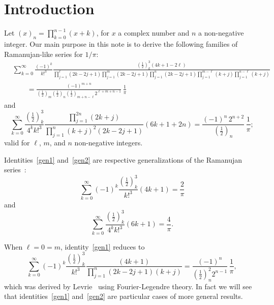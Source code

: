 \documentclass[12pt,reqno]{article}
\begin{document}
\section{Introduction}
Let $\left( x \right)_n  = \prod_{k = 0}^{n - 1} {\left( {x + k} \right)} $, for $x$ a complex number and $n$ a non-negative integer. Our main purpose in this note is to derive the following families of Ramanujan-like series for $1/\pi$:
\begin{align}\label{gen1}
&\sum_{k = 0}^\infty  {\frac{{( - 1)^k }}{{k!^3 }}\frac{{\left( {\frac{1}{2}} \right)_k^3 \left( {4k + 1 - 2\ell} \right)}}{{\prod_{j = 1}^\ell {\left( {2k - 2j + 1} \right)} \prod_{j = 1}^m {\left( {2k - 2j + 1} \right)} \prod_{j = 1}^n {\left( {2k - 2j + 1} \right)} \prod_{j = 1}^{m - \ell} {\left( {k + j} \right)} \prod_{j = 1}^{n - \ell} {\left( {k + j} \right)} }}}\nonumber\\
&\qquad  = \frac{{( - 1)^{m + n} }}{{\left( {\frac{1}{2}} \right)_m \left( {\frac{1}{2}} \right)_n \left( {\frac{1}{2}} \right)_{m + n - \ell} 2^{\ell + m + n - 1} }}\,\frac{1}{\pi }
\end{align}
and
\begin{equation}\label{gen2}
\sum_{k = 0}^\infty  {\frac{{\left( {\frac{1}{2}} \right)_k^3 }}{{4^k k!^3 }}\frac{{\prod_{j = 1}^{2n} {\left( {2k + j} \right)} }}{{\prod_{j = 1}^n {\left( {k + j} \right)^2 \left( {2k - 2j + 1} \right)} }}\left( {6k + 1 + 2n} \right)}  = \frac{{( - 1)^n\,2^{n+2} }}{{\left( {\frac{1}{2}} \right)_n }}\, \frac1{\pi };
\end{equation}
valid for $\ell$, $m$, and $n$ non-negative integers.

Identities~\eqref{gen1} and~\eqref{gen2} are respective generalizations of the Ramanujan series~\cite{ramanujan14}:
\begin{equation}\label{bauer}
\sum_{k = 0}^\infty  {( - 1)^k \frac{{\left( \frac12 \right)_k^3 }}{{k!^3 }}\left( {4k + 1} \right)}  = \frac{2}{\pi }
\end{equation}
and
\begin{equation}
\sum_{k = 0}^\infty  {\frac{{\left( {\frac{1}{2}} \right)_k^3 }}{{4^k k!^3 }}\left( {6k + 1} \right)}  = \frac{4}{\pi }.
\end{equation}

When $\ell=0=m$, identity~\eqref{gen1} reduces to
\begin{equation*}
\sum_{k = 0}^\infty  {( - 1)^k \frac{{\left( {\frac{1}{2}} \right)_k^3 }}{{k!^3 }}\frac{{\left( {4k + 1} \right)}}{{\prod_{j = 1}^n {\left( {2k - 2j + 1} \right)\left( {k + j} \right)} }}}  = \frac{{( - 1)^n }}{{\left( {\frac{1}{2}} \right)_n^2 2^{n - 1} }}\,\frac{1}{\pi },
\end{equation*}
which was derived by Levrie~\cite[Theorem 7]{levrie10} using Fourier-Legendre theory. In fact we will see that identities~\eqref{gen1} and~\eqref{gen2} are particular cases of more general results.
\end{document}
